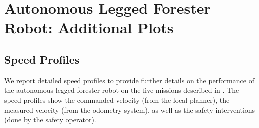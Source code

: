 
\chapter{Autonomous Legged Forester Robot: Additional Plots}
\label{app:B}


  
  
  

\section{Speed Profiles}
We report detailed speed profiles to provide further details on the performance of the autonomous legged forester robot on the five missions described in . The speed profiles show the commanded velocity (from the local planner), the measured velocity (from the odometry system), as well as the safety interventions (done by the safety operator).

